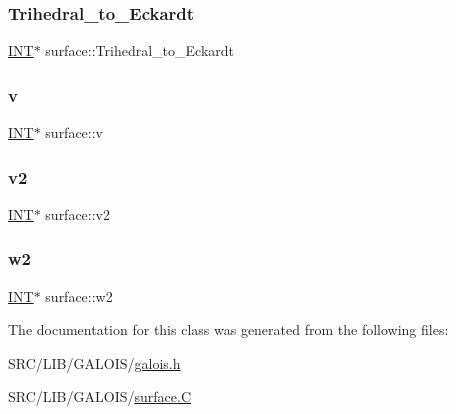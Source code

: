 \mbox{\label{classsurface_accbc50f7a714f4c2cb7f84f99b85dda5}} 
\subsubsection{\texorpdfstring{Trihedral\+\_\+to\+\_\+\+Eckardt}{Trihedral\_to\_Eckardt}}
{\footnotesize\ttfamily \mbox{\hyperlink{galois_8h_a09fddde158a3a20bd2dcadb609de11dc}{I\+NT}}$\ast$ surface\+::\+Trihedral\+\_\+to\+\_\+\+Eckardt}

\mbox{\label{classsurface_a954b79421836692cdd415861d7b6398c}} 
\subsubsection{\texorpdfstring{v}{v}}
{\footnotesize\ttfamily \mbox{\hyperlink{galois_8h_a09fddde158a3a20bd2dcadb609de11dc}{I\+NT}}$\ast$ surface\+::v}

\mbox{\label{classsurface_a8cb014511d85b3faed9057b886965eba}} 
\subsubsection{\texorpdfstring{v2}{v2}}
{\footnotesize\ttfamily \mbox{\hyperlink{galois_8h_a09fddde158a3a20bd2dcadb609de11dc}{I\+NT}}$\ast$ surface\+::v2}

\mbox{\label{classsurface_ada297a727a4b72924172c38319131e5f}} 
\subsubsection{\texorpdfstring{w2}{w2}}
{\footnotesize\ttfamily \mbox{\hyperlink{galois_8h_a09fddde158a3a20bd2dcadb609de11dc}{I\+NT}}$\ast$ surface\+::w2}



The documentation for this class was generated from the following files\+:\begin{DoxyCompactItemize}
\item 
S\+R\+C/\+L\+I\+B/\+G\+A\+L\+O\+I\+S/\mbox{\hyperlink{galois_8h}{galois.\+h}}\item 
S\+R\+C/\+L\+I\+B/\+G\+A\+L\+O\+I\+S/\mbox{\hyperlink{surface_8_c}{surface.\+C}}\end{DoxyCompactItemize}
